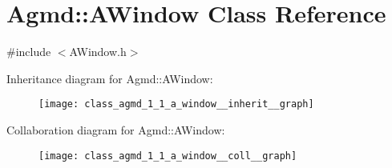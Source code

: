\hypertarget{class_agmd_1_1_a_window}{\section{Agmd\+:\+:A\+Window Class Reference}
\label{class_agmd_1_1_a_window}
}


{\ttfamily \#include $<$A\+Window.\+h$>$}



Inheritance diagram for Agmd\+:\+:A\+Window\+:\nopagebreak
\begin{figure}[H]
\begin{center}
\leavevmode
\texttt{[image: class\_agmd\_1\_1\_a\_window\_\_inherit\_\_graph]}
\end{center}
\end{figure}


Collaboration diagram for Agmd\+:\+:A\+Window\+:\nopagebreak
\begin{figure}[H]
\begin{center}
\leavevmode
\texttt{[image: class\_agmd\_1\_1\_a\_window\_\_coll\_\_graph]}
\end{center}
\end{figure}
